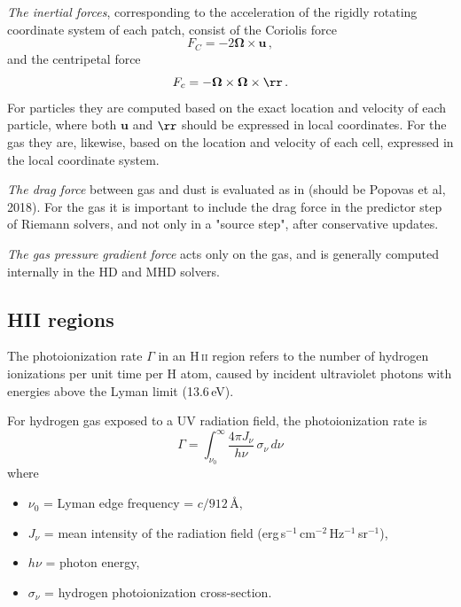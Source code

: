 \documentclass[paper=a4,fontsize=11pt]{scrartcl}
\numberwithin{equation}{section}		%
\numberwithin{figure}{section}			%
\numberwithin{table}{section}				%
\begin{document}
\textit{The inertial forces}, corresponding to the acceleration of the rigidly rotating coordinate system of each patch, consist of the Coriolis force
\def\uu{\mathbf{u}}
\def\Om{\mathbf{\Omega}}
\begin{equation}
    F_{C} = - 2\Om \times \uu \,,
\end{equation}
and the centripetal force
\begin{equation}
    F_{c} = - \Om \times \Om \times \rr \,.
\end{equation}
For particles they are computed based on the exact location and velocity of each particle, where both $\uu$ and $\rr$ should be expressed in local coordinates.  For the gas they are, likewise, based on the location and velocity of each cell, expressed in the local coordinate system.

\textit{The drag force} between gas and dust is evaluated as in \citep{Popovas+2018} (should be Popovas et al, 2018).  For the gas it is important to include the drag force in the predictor step of Riemann solvers, and not only in a "source step", after conservative updates.

\textit{The gas pressure gradient force} acts only on the gas, and is generally computed internally in the HD and MHD solvers. 

\subsection{HII regions}

The photoionization rate $\Gamma$ in an H\,\textsc{ii} region refers to the number of hydrogen ionizations per unit time per H atom, caused by incident ultraviolet photons with energies above the Lyman limit (13.6\,eV).

For hydrogen gas exposed to a UV radiation field, the photoionization rate is
\begin{equation}
\Gamma = \int_{\nu_0}^{\infty} \frac{4\pi J_\nu}{h\nu} \, \sigma_\nu \, d\nu
\end{equation}
where
\begin{itemize}
    \item $\nu_0$ = Lyman edge frequency = $c / 912$\,\AA,
    \item $J_\nu$ = mean intensity of the radiation field (erg\,s$^{-1}$\,cm$^{-2}$\,Hz$^{-1}$\,sr$^{-1}$),
    \item $h\nu$ = photon energy,
    \item $\sigma_\nu$ = hydrogen photoionization cross-section.
\end{itemize}
\end{document}
